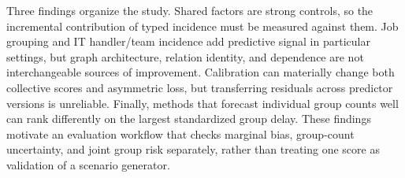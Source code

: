 Three findings organize the study. Shared factors are strong controls, so the
incremental contribution of typed incidence must be measured against them.
Job grouping and IT handler/team incidence add predictive signal in particular
settings, but graph architecture, relation identity, and dependence are not
interchangeable sources of improvement. Calibration can materially change
both collective scores and asymmetric loss,
but transferring residuals across predictor versions is unreliable. Finally,
methods that forecast individual group counts well can rank differently on
the largest standardized group delay. These findings motivate an evaluation
workflow that checks marginal bias, group-count uncertainty, and joint group
risk separately, rather than treating one score as validation of a scenario
generator.
